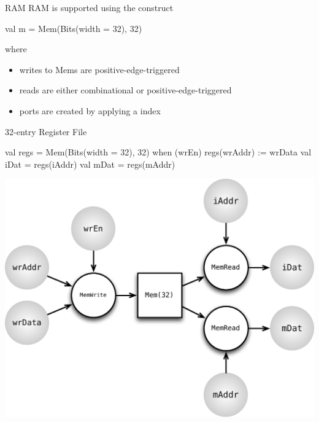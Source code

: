 \documentclass[xcolor=pdflatex,dvipsnames,table]{beamer}
\begin{document}
\begin{frame}[fragile]{RAM}
RAM is supported using the  construct

\begin{scala}
val m = Mem(Bits(width = 32), 32)
\end{scala}

\noindent
where
\begin{itemize}
\item writes to Mems are positive-edge-triggered
\item reads are either combinational or positive-edge-triggered
\item ports are created by applying a  index
\end{itemize}
\end{frame}

\begin{frame}[fragile]{32-entry Register File}

\begin{scala}
val regs = Mem(Bits(width = 32), 32)
when (wrEn) {
  regs(wrAddr) := wrData
}
val iDat = regs(iAddr)
val mDat = regs(mAddr)
\end{scala}

\begin{center}
\includegraphics[height=0.55\textheight]{../cs250/figs/mem.pdf} 
\end{center}

\end{frame}
\end{document}
